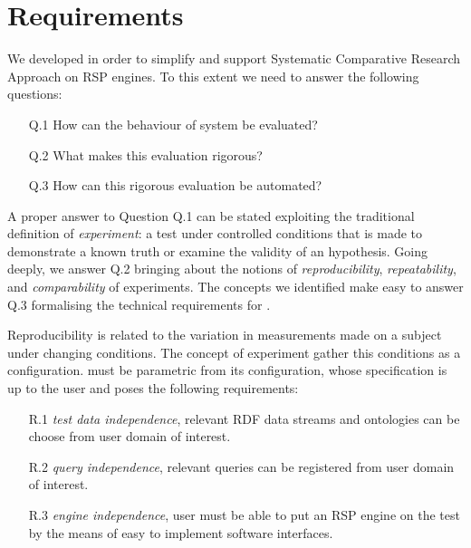 \section{Requirements} \label{sec:requirements}

We developed \name in order to simplify and support Systematic Comparative Research Approach on RSP engines. To this extent we need to answer the following questions: 
\begin{enumerate}
\item[Q.1] How can the behaviour of system be evaluated? 
\item[Q.2] What makes this evaluation rigorous? 
\item[Q.3] How can this rigorous evaluation be automated?
\end{enumerate}

A proper answer to Question Q.1 can be stated exploiting the traditional definition of \textit{experiment}: a test under controlled conditions that is made to demonstrate a known truth or examine the validity of an hypothesis. Going deeply, we answer Q.2 bringing about the notions of \textit{reproducibility}, \textit{repeatability}, and \textit{comparability} of experiments. The concepts we identified make easy to answer Q.3 formalising the technical requirements for \namens.

Reproducibility is related to the variation in measurements made on a subject under changing conditions. The concept of experiment gather this conditions  as a configuration. \name must be parametric from its configuration, whose specification is up to the user and poses the following requirements:
\begin{enumerate}
\item[R.1] \textit{test data independence}, relevant RDF data streams and ontologies can be choose from user domain of interest. %
\item[R.2] \textit{query independence}, relevant queries can be registered from user domain of interest.
\item[R.3] \textit{engine independence}, user must be able to put an RSP engine on the test by the means of easy to implement software interfaces. 
\end{enumerate}

